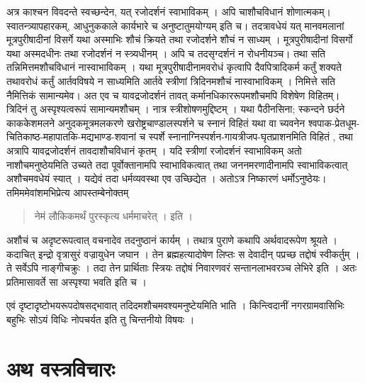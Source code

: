 अत्र काश्चन विवदन्ते स्वच्छन्देन, यत् रजोदर्शनं स्वाभाविकम् । अपि चाशौचविधानं शोणात्मकम्। स्वातन्त्र्यापहारकम्, आधुनुककाले कार्यभारे च अनुष्टातुमयोग्यम् इति च। तदत्रावधेयं यत् मानवमलानां मूत्रपुरीषादीनां विसर्गे यथा अस्माभिः शौचं क्रियते तथा रजोदर्शने शौचं न साध्यम् । मूत्रपुरीषादीनां विसर्गो यथा अस्मदधीनः तथा रजोदर्शनं न स्त्र्यधीनम् । अपि च तदसृग्दर्शनं न रोधनीयञ्च। तथा सति तन्निमित्तमशौचविधानं नास्वाभाविकम् । यथा मूत्रपुरीषादीनामवरोधं कृत्वापि दैवपित्रादिकर्म कर्तुं शक्यते तथावरोधं कर्तुं आर्तवविषये न साध्यमिति आर्तवे स्त्रीणां त्रिदिनमशौचं नास्वाभाविकम् । निमित्ते सति नैमित्तिकं सामान्यमेव। अत एव च यावद्रजोदर्शनं तावत् कर्मानधिकाररूपमशौचमपि विशेषेण विहितम्। त्रिदिनं तु अस्पृश्यत्वरूपं सामान्यमशौचम् । नात्र स्त्रीशोषणमुद्दिष्टम् । यथा पैठीनसिना; स्कन्दने छर्दने काककेशमलने अनुदकमूत्रमलकरणे खरोष्ट्रचाण्डालस्पर्शने च स्नानं विहितं यथा वा च्यवनेन श्वपाक-प्रेतधूम-चितिकाष्ठ-महापातकि-मद्यभाण्ड-शवानां च स्पर्शे स्नानाग्निस्पर्शन-गायत्रीजप-घृतप्राशनमिति विहितं , तथा अत्रापि यावद्रजोदर्शनं तावदाशौचविधानं कृतम् । यदि स्त्रीणां रजोदर्शनं स्वाभाविकम् अतो नाशौचमनुष्ठेयमिति उच्यते तदा पूर्वोक्तानामपि स्वाभाविकत्वात् तथा जननमरणादीनामपि स्वाभाविकत्वात् अशौचमवधेयं स्यात् । यद्येवं तदा धर्मव्यवस्था एव उच्छिद्येत । अतोऽत्र निष्कारणं धर्मोऽनुष्ठेयः। तमिममेवांशमभिप्रेत्य आपस्तम्बेनोक्तम्  
\begin{verse}
नेमं लौकिकमर्थं पुरस्कृत्य धर्ममाचरेत् । इति । 
\end{verse}
अशौचं च अदृष्टरूपत्वात् वचनादेव तदनुष्ठानं कार्यम् । तथात्र पुराणे कथापि अर्थवादरूपेण श्रूयते । कदाचित् इन्द्रो वृत्रासुरं वज्रायुधेन जघान । तेन ब्रह्महत्यादोषेण लिप्तः स देवादीन् पप्रच्छ तद्दोषं स्वीकर्तुम् । ते सर्वेऽपि नाङ्गीचक्रुः । तदा तेन प्रार्थिताः स्त्रियः तद्दोषं निवारणवरं सन्तानलाभवरञ्च लेभिरे इति । अतः प्रतिमासावर्ते सा अस्पृश्या भवति इति च । 

एवं दृष्टादृष्टोभयरूपदोषसद्भावात् तदिदमशौचमवश्यमनुष्टेयमिति भाति । किन्त्विदानीं नगरग्रामवासिभिः बहुभिः सोऽयं विधिः नोपचर्यत इति तु चिन्तनीयो विषयः ।

\section*{अथ वस्त्रविचारः}

